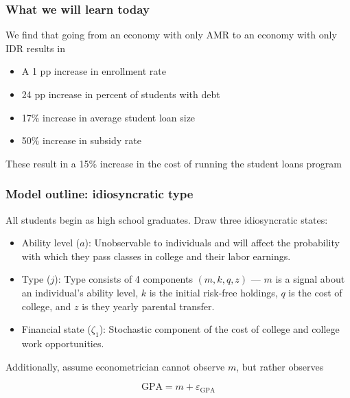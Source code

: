 \documentclass[10pt]{beamer}
\begin{document}
  \begin{frame} \frametitle{What we will learn today}

    We find that going from an economy with only AMR to an economy with only IDR results in

    \vspace{0.5cm}

    \begin{itemize}
      \item A 1 pp increase in enrollment rate
      \item 24 pp increase in percent of students with debt
      \item 17\% increase in average student loan size
      \item 50\% increase in subsidy rate
    \end{itemize}

    \vspace{0.5cm}

    These result in a 15\% increase in the cost of running the student loans program

  \end{frame}

  \begin{frame} \frametitle{Model outline: idiosyncratic type}

    All students begin as high school graduates. Draw three idiosyncratic states:

    \begin{itemize}
      \item Ability level ($a$): Unobservable to individuals and will affect the probability with
      which they pass classes in college and their labor earnings.
      \item Type ($j$): Type consists of 4 components $(m, k, q, z)$ --- $m$ is a signal about an
      individual's ability level, $k$ is the initial risk-free holdings, $q$ is the cost of college,
      and $z$ is they yearly parental transfer.
      \item Financial state ($\zeta_1$): Stochastic component of the cost of college and college
      work opportunities.
    \end{itemize}

    Additionally, assume econometrician cannot observe $m$, but rather observes

    $$\text{GPA} = m + \varepsilon_{\text{GPA}}$$

  \end{frame}
\end{document}
